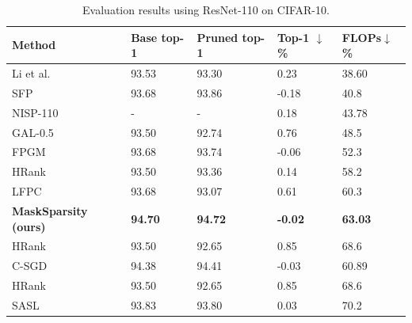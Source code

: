 \documentclass[review]{cvpr}
\begin{document}
\begin{table}[ht]
	\caption{Evaluation results using ResNet-110 on CIFAR-10.}
	
	\small
	\setlength{\tabcolsep}{0.01em}
	\begin{center}
		\begin{tabular}{lllll}
			\hline
			
			Method 							&Base top-1		&Pruned top-1	& Top-1 $\downarrow$\% 	&FLOPs$\downarrow$\%	 			\\
			\hline
			
			
			Li et al. \cite{li2016pruning}		    &	93.53	&	93.30	&	0.23 		&	38.60	    \\
			SFP \cite{he2018soft}					&	93.68	&	93.86	&	-0.18	    &	40.8	    \\
			NISP-110 \cite{yu2018nisp}				&	-		&	-		&	0.18		&	43.78		\\
			GAL-0.5 \cite{GAL}						&	93.50	&	92.74	&	0.76		&	48.5		\\
			
			FPGM \cite{FPGM}		&93.68	&93.74	&	-0.06	&	52.3\\

			
			
			HRank \cite{HRank}						&	93.50	&	93.36	&	0.14		&	58.2		\\
			
			LFPC \cite{he2020learning}				&	93.68	&	93.07	&	0.61	    &	60.3	    \\
			\textbf{MaskSparsity (ours)}	&	\textbf{94.70}	&	\textbf{94.72}	&	\textbf{-0.02}	&	\textbf{63.03}\\
			HRank \cite{HRank}		&	93.50	&	92.65	&      0.85		&	68.6		\\
		
		
		   	C-SGD \cite{CSGD}						&	94.38	&	94.41	&	-0.03		&	60.89		\\
		    HRank									&	93.50	&	92.65	&	0.85		&	68.6		\\
		    
		    SASL \cite{SASL}						&	93.83	&	93.80	&	0.03		&	70.2		\\
		 
			
			\hline
			
		\end{tabular}
	\end{center}
	\label{exp-table-cifar10-r110}
\end{table}
 
\end{document}
